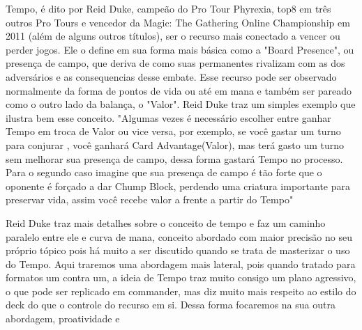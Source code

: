 Tempo, é dito por Reid Duke, campeão do Pro Tour Phyrexia, top8 em três outros Pro Tours e vencedor da Magic: The Gathering Online Championship em 2011 (além de alguns outros títulos), ser o recurso mais conectado a vencer ou perder jogos.
Ele o define em sua forma mais básica como a "Board Presence", ou presença de campo, que deriva de como suas permanentes rivalizam com as dos adversários e as consequencias desse embate.
Esse recurso pode ser observado normalmente da forma de pontos de vida ou até em mana e também ser pareado como o outro lado da balança, o "Valor". Reid Duke traz um simples exemplo que ilustra bem esse conceito.
"Algumas vezes é necessário escolher entre ganhar Tempo em troca de Valor ou vice versa, por exemplo, se você gastar um turno para conjurar , você ganhará Card Advantage(Valor), mas terá gasto um turno sem melhorar sua presença de campo, dessa forma gastará Tempo no processo. Para o segundo caso imagine que sua presença de campo é tão forte que o oponente é forçado a dar Chump Block, perdendo uma criatura importante para preservar vida, assim você recebe valor a frente a partir do Tempo"

Reid Duke traz mais detalhes sobre o conceito de tempo e faz um caminho paralelo entre ele e curva de mana, conceito abordado com maior precisão no seu próprio tópico pois há muito a ser discutido quando se trata de masterizar o uso do Tempo.
Aqui traremos uma abordagem mais lateral, pois quando tratado para formatos um contra um, a ideia de Tempo traz muito consigo um plano agressivo, o que pode ser replicado em commander, mas diz muito mais respeito ao estilo do deck do que o controle do recurso em si.
Dessa forma focaremos na sua outra abordagem, proatividade e 
